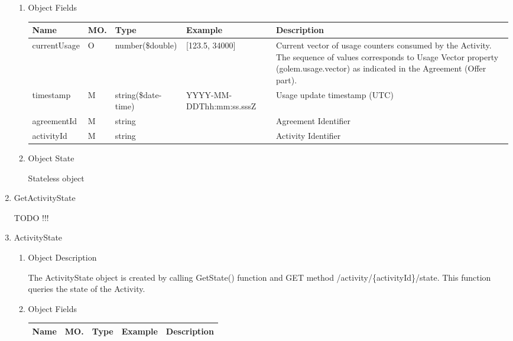 \begin{enumerate}
\begin{enumerate}
\item Object Fields

\begin{table}[H]
\footnotesize
\begin{center}
\begin{tabular}{|p{3cm}|l|p{3cm}|p{3cm}|p{4cm}|} 
\hline
\rowcolor{lightgray}	Name	& MO.& Type		& Example 	& 	Description \\
\hline

currentUsage 		&  O & number(\$double) 	& [123.5, 34000]	&  	Current vector of usage counters consumed by the Activity. 
																	The sequence of values corresponds to Usage Vector property 
																	(golem.usage.vector) as indicated in the Agreement (Offer part).\\
\hline 		

timestamp 			&  M &  string(\$date-time) & 	YYYY-MM-DDThh:mm:ss.sssZ	& 	Usage update timestamp (UTC) \\
\hline

agreementId 		&  M & string 			& 					& 	Agreement Identifier \\
\hline

activityId 			&  M & string 			& 					& 	Activity Identifier \\
\hline

\end{tabular}
\end{center}
\end{table}

\item Object State

Stateless object

\end{enumerate}

\item GetActivityState

TODO !!!

\item ActivityState

\begin{enumerate}

\item Object Description

The ActivityState object is created by calling GetState() function
and GET method /activity/\{activityId\}/state. This function queries the state of the Activity. 

\item Object Fields

\begin{table}[H]
\footnotesize
\begin{center}
\begin{tabular}{|p{3cm}|l|p{3cm}|p{3cm}|p{4cm}|} 
\hline
\rowcolor{lightgray}	Name	& MO.	& Type	& Example & 	Description \\
\hline


\end{tabular}
\end{center}
\end{table}
\end{enumerate}
\end{enumerate}
